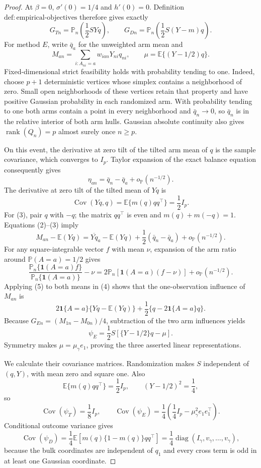 \documentclass{article}
\begin{document}
\begin{proof}
At \(\beta=0\), \(\sigma'(0)=1/4\) and \(h'(0)=0\).  Definition \(\mathrm{def{:}empirical\mbox{-}objectives}\) therefore gives exactly
\[
 G_{Tn}=\mathbb P_n\!\left(\frac12SYq\right),
 \qquad
 G_{Dn}=\mathbb P_n\!\left(\frac12S(Y-m)q\right).
 \tag{1}
\]
For method \(E\), write \(\bar q_a\) for the unweighted arm mean and
\[
 M_{an}=\sum_{i:A_{ni}=a}w_{ian}Y_{ni}q_{ni},
 \qquad \mu=\mathbb E\{(Y-1/2)q\}.
\]
Fixed-dimensional strict feasibility holds with probability tending to one.  Indeed, choose \(p+1\) deterministic vertices whose simplex contains a neighborhood of zero.  Small open neighborhoods of these vertices retain that property and have positive Gaussian probability in each randomized arm.  With probability tending to one both arms contain a point in every neighborhood and \(\bar q_n\to0\), so \(\bar q_n\) is in the relative interior of both arm hulls.  Gaussian absolute continuity also gives \(\operatorname{rank}(Q_n)=p\) almost surely once \(n\ge p\).

On this event, the derivative at zero tilt of the tilted arm mean of \(q\) is the sample covariance, which converges to \(I_p\).  Taylor expansion of the exact balance equation consequently gives
\[
 \eta_{an}=\bar q_n-\bar q_a+o_{\mathbb P}(n^{-1/2}).
 \tag{2}
\]
The derivative at zero tilt of the tilted mean of \(Yq\) is
\[
 \operatorname{Cov}(Yq,q)=\mathbb E\{m(q)qq^\top\}=\frac12I_p.
 \tag{3}
\]
For (3), pair \(q\) with \(-q\); the matrix \(qq^\top\) is even and \(m(q)+m(-q)=1\).  Equations (2)--(3) imply
\[
 M_{an}-\mathbb E(Yq)
 =\overline{Yq}_a-\mathbb E(Yq)
  +\frac12(\bar q_n-\bar q_a)+o_{\mathbb P}(n^{-1/2}).
 \tag{4}
\]
For any square-integrable vector \(f\) with mean \(\nu\), expansion of the arm ratio around \(\mathbb P(A=a)=1/2\) gives
\[
 \frac{\mathbb P_n\{\mathbf1(A=a)f\}}
      {\mathbb P_n\{\mathbf1(A=a)\}}-\nu
 =2\mathbb P_n[\mathbf1(A=a)(f-\nu)]+o_{\mathbb P}(n^{-1/2}).
 \tag{5}
\]
Applying (5) to both means in (4) shows that the one-observation influence of \(M_{an}\) is
\[
 2\mathbf1\{A=a\}\{Yq-\mathbb E(Yq)\}
 +\frac12\{q-2\mathbf1\{A=a\}q\}.
\]
Because \(G_{En}=(M_{1n}-M_{0n})/4\), subtraction of the two arm influences yields
\[
 \psi_E=\frac12S\left[\{Y-1/2\}q-\mu\right].
 \tag{6}
\]
Symmetry makes \(\mu=\mu_\gamma e_1\), proving the three asserted linear representations.

We calculate their covariance matrices.  Randomization makes \(S\) independent of \((q,Y)\), with mean zero and square one.  Also
\[
 \mathbb E\{m(q)qq^\top\}=\frac12I_p,
 \qquad
 (Y-1/2)^2=\frac14,
\]
so
\[
 \operatorname{Cov}(\psi_T)=\frac18I_p,
 \qquad
 \operatorname{Cov}(\psi_E)
 =\frac14\left(\frac14I_p-\mu_\gamma^2e_1e_1^\top\right).
 \tag{7}
\]
Conditional outcome variance gives
\[
 \operatorname{Cov}(\psi_D)
 =\frac14\mathbb E\!\left[m(q)\{1-m(q)\}qq^\top\right]
 =\frac14\operatorname{diag}(I_\gamma,v_\gamma,\ldots,v_\gamma),
 \tag{8}
\]
because the bulk coordinates are independent of \(q_1\) and every cross term is odd in at least one Gaussian coordinate.


\end{proof}
\end{document}
